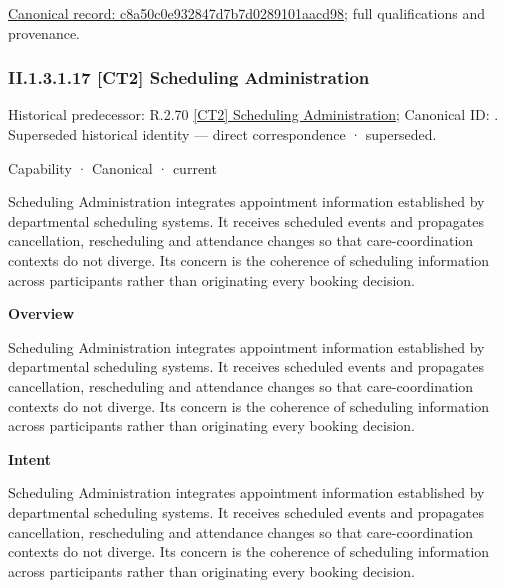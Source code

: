 {\footnotesize \href{../../../../../../../continuum/strategy/capability/feature/c8a50c0e932847d7b7d0289101aacd98.md}{Canonical record: c8a50c0e932847d7b7d0289101aacd98}; full qualifications and provenance.}\par
\subsubsection*{II.1.3.1.17 [CT2] Scheduling Administration}
\label{navigation:II.1.3.1.17}

{\small Historical predecessor: R.2.70 \hyperref[element:1a6630940ffb44fcad4543b93a367b67]{[CT2] Scheduling Administration}; Canonical ID: \texttt{}. Superseded historical identity — direct correspondence · superseded.}\par
\label{element:35fb3744c900470f9895056246a13fb1}
{\small Capability · Canonical · current}\par

Scheduling Administration integrates appointment information established by departmental scheduling systems. It receives scheduled events and propagates cancellation, rescheduling and attendance changes so that care-coordination contexts do not diverge. Its concern is the coherence of scheduling information across participants rather than originating every booking decision.



\textbf{Overview}



Scheduling Administration integrates appointment information established by departmental scheduling systems. It receives scheduled events and propagates cancellation, rescheduling and attendance changes so that care-coordination contexts do not diverge. Its concern is the coherence of scheduling information across participants rather than originating every booking decision.



\textbf{Intent}



Scheduling Administration integrates appointment information established by departmental scheduling systems. It receives scheduled events and propagates cancellation, rescheduling and attendance changes so that care-coordination contexts do not diverge. Its concern is the coherence of scheduling information across participants rather than originating every booking decision.




